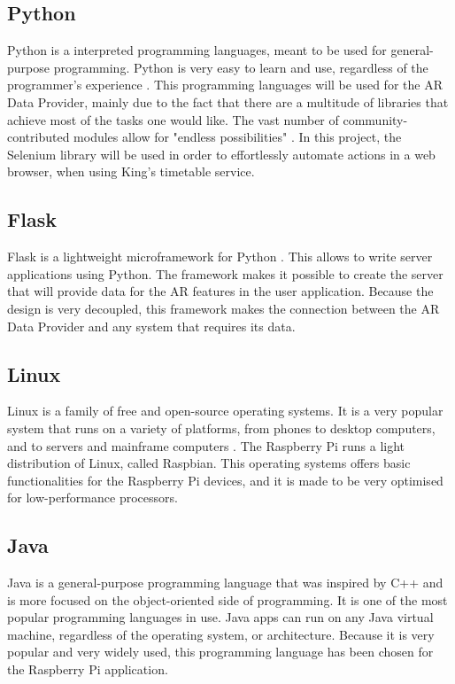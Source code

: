 \subsection{Python}
Python is a interpreted programming languages, meant to be used for general-purpose programming. Python is very easy to learn and use, regardless of the programmer's experience \cite{python}. This programming languages will be used for the AR Data Provider, mainly due to the fact that there are a multitude of libraries that achieve most of the tasks one would like. The vast number of community-contributed modules allow for "endless possibilities" \cite{python}. In this project, the Selenium library will be used in order to effortlessly automate actions in a web browser, when using King's timetable service.

\subsection{Flask}
Flask is a lightweight microframework for Python \cite{flask}. This allows to write server applications using Python. The framework makes it possible to create the server that will provide data for the AR features in the user application. Because the design is very decoupled, this framework makes the connection between the AR Data Provider and any system that requires its data.

\subsection{Linux}
Linux is a family of free and open-source operating systems. It is a very popular system that runs on a variety of platforms, from phones to desktop computers, and to servers and mainframe computers \cite{linux}. The Raspberry Pi runs a light distribution of Linux, called Raspbian. This operating systems offers basic functionalities for the Raspberry Pi devices, and it is made to be very optimised for low-performance processors.

\subsection{Java}
Java is a general-purpose programming language that was inspired by C++ and is more focused on the object-oriented side of programming. It is one of the most popular programming languages in use. Java apps can run on any Java virtual machine, regardless of the operating system, or architecture. Because it is very popular and very widely used, this programming language has been chosen for the Raspberry Pi application.

